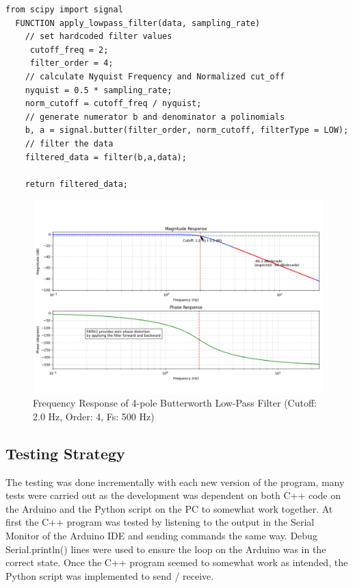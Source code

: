 \begin{lstlisting}[style=cstyle, caption=Python apply\_lowpass\_filter() PseudoCode, label=lst:pythonLowPassFilter]
  from scipy import signal
  FUNCTION apply_lowpass_filter(data, sampling_rate)
    // set hardcoded filter values
     cutoff_freq = 2;
     filter_order = 4;
    // calculate Nyquist Frequency and Normalized cut_off
    nyquist = 0.5 * sampling_rate;
    norm_cutoff = cutoff_freq / nyquist;
    // generate numerator b and denominator a polinomials 
    b, a = signal.butter(filter_order, norm_cutoff, filterType = LOW);
    // filter the data
    filtered_data = filter(b,a,data);

    return filtered_data;

\end{lstlisting}

\begin{figure}[htbp] 
  \centering
  \includegraphics[width=1\textwidth]{chapters/methodology/ArduinoDAQ/filter_response.png}
  \caption{Frequency Response of 4-pole Butterworth Low-Pass Filter (Cutoff: 2.0 Hz, Order: 4, Fs: 500 Hz)}
  \label{fig:filterResponse}
\end{figure}

\subsection{Testing Strategy}
The testing was done incrementally with each new version of the program, many tests were carried out as the development was dependent on both C++ code on the Arduino and the Python script on the PC to somewhat work together. At first the C++ program was tested by listening to the output in the Serial Monitor of the Arduino IDE and sending commands the same way. Debug Serial.println() lines were used to ensure the loop on the Arduino was in the correct state. Once the C++ program seemed to somewhat work as intended, the Python script was implemented to send / receive. 

